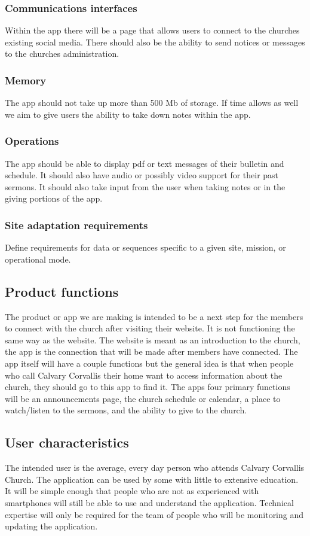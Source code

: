\documentclass[letterpaper,10pt,draftclsnofoot,onecolumn,titlepage]{IEEEtran}
\begin{document}
	\subsubsection{Communications interfaces}
	Within the app there will be a page that allows users to connect to the churches existing social media.
	There should also be the ability to send notices or messages to the churches administration.

	\subsubsection{Memory}
	The app should not take up more than 500 Mb of storage.
	If time allows as well we aim to give users the ability to take down notes within the app.

	\subsubsection{Operations}
	The app should be able to display pdf or text messages of their bulletin and schedule.
	It should also have audio or possibly video support for their past sermons.
	It should also take input from the user when taking notes or in the giving portions of the app.

	\subsubsection{Site adaptation requirements}
	Define requirements for data or sequences specific to a given site, mission, or operational mode.

	\subsection{Product functions}
	The product or app we are making is intended to be a next step for the members to connect with the church after visiting their website.
	It is not functioning the same way as the website.
	The website is meant as an introduction to the church, the app is the connection that will be made after members have connected.
	The app itself will have a couple functions but the general idea is that when people who call Calvary Corvallis their home want to access information about the church, they should go to this app to find it.
	The apps four primary functions will be an announcements page, the church schedule or calendar, a place to watch/listen to the sermons, and the ability to give to the church.

	\subsection{User characteristics}
	The intended user is the average, every day person who attends Calvary Corvallis Church.
	The application can be used by some with little to extensive education.
	It will be simple enough that people who are not as experienced with smartphones will still be able to use and understand the application.
	Technical expertise will only be required for the team of people who will be monitoring and updating the application.
	
\end{document}
